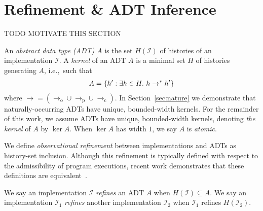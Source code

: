 \section{Refinement \& ADT Inference}
\label{sec:inference}

TODO MOTIVATE THIS SECTION

An \emph{abstract data type (ADT)} $A$ is the set $H(\mathcal{I})$ of histories
of an implementation $\mathcal{I}$. A \emph{kernel} of an ADT $A$ is a minimal
set $H$ of histories generating $A$, i.e.,~such that
\begin{align*}
  A = {\{{ h' : \exists h \in H.\ h \to^\ast h' }\}}
\end{align*}
where $\to = (\to_\mathrm{o} \cup \to_\mathrm{p} \cup \to_\mathrm{c})$. In
Section~\ref{sec:nature} we demonstrate that naturally-occurring ADTs have
unique, bounded-width kernels. For the remainder of this work, we assume ADTs
have unique, bounded-width kernels, denoting \emph{the kernel} of $A$ by
$\ker A$. When $\ker A$ has width $1$, we say $A$ is \emph{atomic}.

We define \emph{observational refinement} between implementations and ADTs as
history-set inclusion. Although this refinement is typically defined with
respect to the admissibility of program executions, recent work demonstrates
that these definitions are equivalent~\cite{conf/popl/BouajjaniEEH15}.

\begin{definition}

  We say an implementation $\mathcal{I}$ \emph{refines} an ADT $A$ when
  $H(\mathcal{I}) \subseteq A$. We say an implementation $\mathcal{I}_1$
  \emph{refines} another implementation $\mathcal{I}_2$ when $\mathcal{I}_1$
  refines $H(\mathcal{I}_2)$.

\end{definition}

